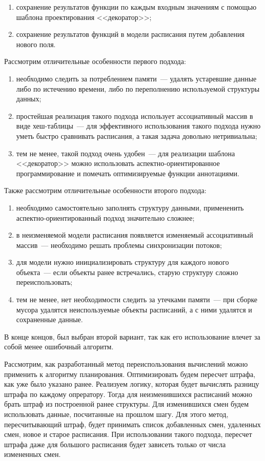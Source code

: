 \documentclass[times,specification,annotation]{itmo-student-thesis}
\begin{document}
\begin{enumerate}
    \item сохранение результатов функции по каждым входным значениям с помощью шаблона проектирования <<декоратор>>;
    \item сохранение результатов функций в модели расписания путем добавления нового поля.
\end{enumerate}

Рассмотрим отличительные особенности первого подхода:

\begin{enumerate}
    \item необходимо следить за потреблением памяти~--- удалять устаревшие данные либо по истечению времени, либо по переполнению используемой структуры данных;
    \item простейшая реализация такого подхода использует ассоциативный массив в виде хеш-таблицы~--- для эффективного использования такого подхода нужно уметь быстро сравнивать расписания, а такая задача довольно нетривиальна;
    \item тем не менее, такой подход очень удобен~--- для реализации шаблона <<декоратор>> можно использовать аспектно-ориентированное программирование и помечать оптимизируемые функции аннотациями.
\end{enumerate}

Также рассмотрим отличительные особенности второго подхода:

\begin{enumerate}
    \item необходимо самостоятельно заполнять структуру данными, примененить аспектно-ориентированный подход значительно сложнее;
    \item в неизменяемой модели расписания появляется изменяемый ассоциативный массив~--- необходимо решать проблемы синхронизации потоков;
    \item для модели нужно инициализировать структуру для каждого нового объекта~--- если объекты ранее встречались, старую структуру сложно переиспользовать;
    \item тем не менее, нет необходимости следить за утечками памяти~--- при сборке мусора удалятся неиспользуемые объекты расписаний, а с ними удалятся и сохраненные данные.
\end{enumerate}

В конце концов, был выбран второй вариант, так как его использование влечет за собой менее ошибочный алгоритм.

Рассмотрим, как разработанный метод переиспользования вычислений можно применить к алгоритму планирования.
Оптимизировать будем пересчет штрафа, как уже было указано ранее.
Реализуем логику, которая будет вычислять разницу штрафа по каждому опрератору.
Тогда для неизменившихся расписаний можно брать штраф из построенной ранее структуры.
Для изменившихся смен будем использовать данные, посчитанные на прошлом шагу.
Для этого метод, пересчитывающий штраф, будет принимать список добавленных смен, удаленных смен, новое и старое расписания.
При использовании такого подхода, пересчет штрафа даже для большого расписания будет зависеть только от числа измененных смен.
\end{document}
